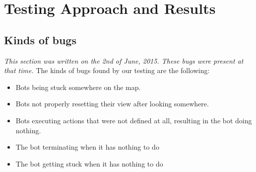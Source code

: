 \chapter{Testing Approach and Results}
\section{Kinds of bugs}
\emph{This section was written on the 2nd of June, 2015. These bugs were present at that time.}
\newline\newline
The kinds of bugs found by our testing are the following:

\begin{itemize}
\item Bots being stuck somewhere on the map.
\item Bots not properly resetting their view after looking somewhere.
\item Bots executing actions that were not defined at all, resulting in the bot doing nothing.
\item The bot terminating when it has nothing to do
\item The bot getting stuck when it has nothing to do
\end{itemize}